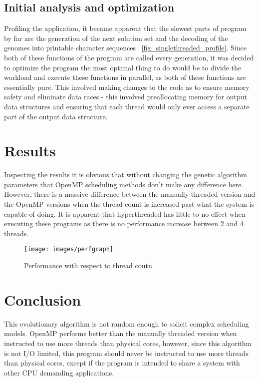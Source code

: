 \documentclass[journal,transmag]{IEEEtran}
\begin{document}
        \subsection{Initial analysis and optimization} 
        Profiling the application, it became apparent that the slowest parts of program
        by far are the generation of the next solution set and the decoding of the genomes
        into printable character sequences ~\ref{fig_singlethreaded_profile}. Since both of these
        functions of the program are called every generation, it was decided to optimize the program
        the most optimal thing to do would be to divide the workload and execute these
        functions in parallel, as both of these functions are essentially pure. This involved making
        changes to the code as to ensure memory safety and eliminate data races - this involved
        preallocating memory for output data structures and ensuring that each thread would
        only ever access a separate part of the output data structure. 

        

        
        
        
        

\section{Results}
Inspecting the results it is obvious that without changing the genetic algorithm parameters
that OpenMP scheduling methods don't make any difference here. However, there is a massive
difference between the manually threaded version and the OpenMP versions when the thread count
is increased past what the system is capable of doing. It is apparent that hyperthreaded
has little to no effect when executing these programs as there is no performance increase
between 2 and 4 threads.

	
	
\begin{figure}[!t]
\centering
\texttt{[image: images/perfgraph]}
\caption{Performance with respect to thread coutn}
\label{fig_performance_dif}
\end{figure}


\section{Conclusion}
This evolutionary algorithm is not  random enough to solicit complex scheduling models.
OpenMP performs better than the manually threaded version when instructed to use more 
threads than physical cores, however, since this algorithm is not I/O limited, this
program should never be instructed to use more threads than physical cores, except if
the program is intended to share a system with other CPU demanding applications.
\end{document}
